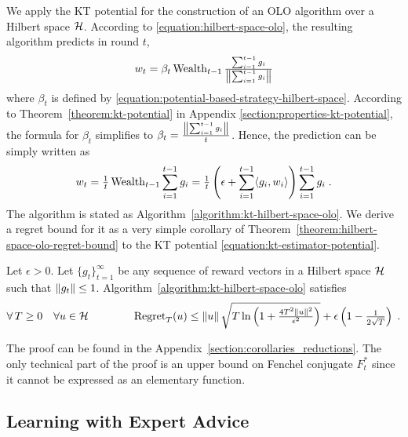 We apply the KT potential for the construction of an OLO algorithm over a Hilbert
space $\mathcal{H}$. According to \eqref{equation:hilbert-space-olo}, the resulting algorithm predicts
in round $t$,
\[
w_t = \beta_t \operatorname{Wealth}_{t-1} \tfrac{\sum_{i=1}^{t-1} g_i}{\left\|{\sum_{i=1}^{t-1} g_i}\right\|}
\]
where $\beta_t$ is defined by
\eqref{equation:potential-based-strategy-hilbert-space}. According to
Theorem~\ref{theorem:kt-potential} in Appendix
\ref{section:properties-kt-potential}, the formula for $\beta_t$ simplifies to
$\beta_t = \frac{\left\|{\sum_{i=1}^{t-1} g_i}\right\|}{t}$. Hence, the prediction can be
simply written as
\[
w_t
= \tfrac{1}{t} \operatorname{Wealth}_{t-1} \sum_{i=1}^{t-1} g_i
= \tfrac{1}{t} \left(\epsilon + \sum_{i=1}^{t-1} \langle g_i, w_i \rangle \right) \sum_{i=1}^{t-1} g_i \; .
\]
The algorithm is stated as Algorithm~\ref{algorithm:kt-hilbert-space-olo}.  We
derive a regret bound for it as a very simple corollary of
Theorem~\ref{theorem:hilbert-space-olo-regret-bound} to the KT potential
\eqref{equation:kt-estimator-potential}.  \begin{corollary}
\label{corollary:kt-hilbert-space-olo-regret} Let $\epsilon > 0$. Let
$\{g_t\}_{t=1}^\infty$ be any sequence of reward vectors in a Hilbert space
$\mathcal{H}$ such that $\left\|{g_t}\right\| \le 1$.
Algorithm~\ref{algorithm:kt-hilbert-space-olo} satisfies
\[
\forall \, T \ge 0 \quad
\forall u \in \mathcal{H} \qquad \qquad
\operatorname{Regret}_T(u) \le \left\|{u}\right\| \sqrt{T \ln\left(1 + \tfrac{4T^2 \left\|{u}\right\|^2}{\epsilon^2} \right)} + \epsilon \left(1 - \tfrac{1}{2\sqrt{T}} \right) \;.
\]
\end{corollary}
The proof can be found in the Appendix~\ref{section:corollaries_reductions}. The only technical
part of the proof is an upper bound on Fenchel conjugate $F_t^*$ since it cannot
be expressed as an elementary function.

\subsection{Learning with Expert Advice}
\label{section:kt-lea}

